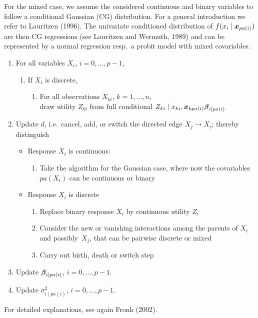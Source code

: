 For the mixed case, we assume the considered continuous and binary
variables to follow a conditional Gaussian (CG) distribution. For
a general introduction we refer to Lauritzen (1996). The
univariate conditioned distribution of $f(x_i \mid \mbox{\boldmath $x$}_{pa(i)})$
are then CG regressions (see Lauritzen and Wermuth, 1989) and can
be represented by a normal regression resp.~a probit model with
mixed covariables.
\begin{enumerate}
\item For all variables $X_i$, $i=0, \dots, p-1$,
    \begin{enumerate}
       \item[] If $X_i$ is discrete,
            \begin{enumerate}
            \item[] For all observations $X_{ki}$, $k=1, \dots, n$,  \\
                    draw utility $Z_{ki}$ from full conditional $Z_{ki} \mid x_{ki}, \mbox{\boldmath $x$}_{k pa(i)} \mbox{\boldmath $\beta$}_{i \mid pa(i)}$
            \end{enumerate}
    \end{enumerate}
\item Update $d$, i.e.~cancel, add, or switch the directed edge $X_j \rightarrow X_i$;
      thereby distinguish
    \begin{itemize}
    \item Response $X_i$ is continuous:
    \begin{enumerate}
     \item Take the algorithm for the Gaussian case, where now the covariables
            $pa(X_i)$ can be continuous or binary
     \end{enumerate}
    \item Response $X_i$ is discrete
     \begin{enumerate}
     \item Replace binary response $X_i$ by continuous utility $Z_i$
     \item Consider the new or vanishing interactions among the parents of
     $X_i$ and possibly~$X_j$, that can be pairwise discrete or mixed
     \item Carry out birth, death or switch step
     \end{enumerate}
    \end{itemize}
\item Update $\mbox{\boldmath $\beta$}_{i\mid pa(i)}$, $i=0, \dots, p-1$.
\item Update $\sigma^2_{i\mid pa(i)}$, $i=0, \dots, p-1$.
\end{enumerate}
%
For detailed explanations, see again Fronk (2002).


